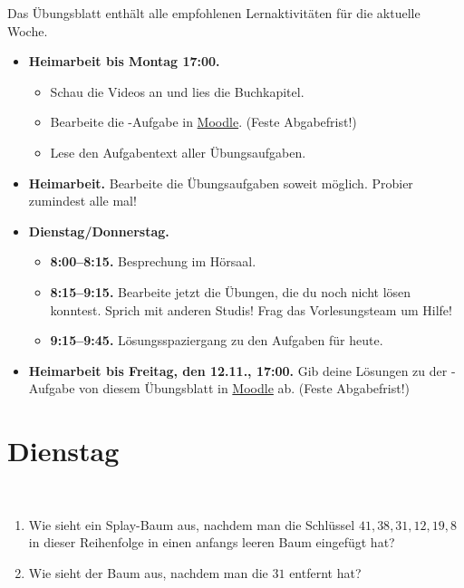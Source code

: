 \documentclass{uebung_cs}
\begin{document}
Das Übungsblatt enthält alle empfohlenen Lernaktivitäten für die aktuelle Woche.

\begin{itemize}
\item \textbf{Heimarbeit bis Montag 17:00.}
    \begin{itemize}
    \item 
    Schau die Videos an und lies die Buchkapitel.
    \item Bearbeite die -Aufgabe in \href{https://moodle.studiumdigitale.uni-frankfurt.de/moodle/course/view.php?id=2241}{Moodle}. (Feste Abgabefrist!)
    \item Lese den Aufgabentext aller Übungsaufgaben.
    \end{itemize}
\item \textbf{Heimarbeit.} Bearbeite die Übungsaufgaben soweit möglich. Probier zumindest alle mal!
\item \textbf{Dienstag/Donnerstag.}
\begin{itemize}
    \item \textbf{8:00--8:15.} Besprechung im Hörsaal.
    \item \textbf{8:15--9:15.} Bearbeite jetzt die Übungen, die du noch nicht lösen konntest. Sprich mit anderen Studis! Frag das Vorlesungsteam um Hilfe!
    \item \textbf{9:15--9:45.} Lösungsspaziergang zu den Aufgaben für heute.
\end{itemize}

\item \textbf{Heimarbeit bis Freitag, den 12.11., 17:00.} Gib deine Lösungen zu der -Aufgabe von diesem Übungsblatt in \href{https://moodle.studiumdigitale.uni-frankfurt.de/moodle/course/view.php?id=2241}{Moodle} ab. (Feste Abgabefrist!)
\end{itemize}

\section*{Dienstag}

\begin{aufgabe}
\
	\begin{enumerate}
		\item Wie sieht ein Splay-Baum aus, nachdem man die Schlüssel $41,38,31,12,19,8$ in dieser Reihenfolge in einen anfangs leeren Baum eingefügt hat? \\
		\item Wie sieht der Baum aus, nachdem man die $31$ entfernt hat?
	\end{enumerate}		
\end{aufgabe}
\end{document}
